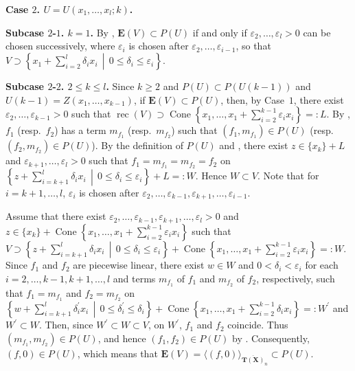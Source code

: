 \documentclass[a4paper,12pt]{amsart}
\theoremstyle{plain}
\theoremstyle{definition}
\begin{document}
\textbf{Case $2$. $U = U(x_1, \ldots, x_l;k)$.}

\textbf{Subcase $2$-$1$. $k = 1$.}
By \cite[the proofs of Propositions~3.18 and 3.19]{Nakajima=Song}, $\boldsymbol{E}(V) \subset P(U)$ if and only if $\varepsilon_2,\ldots,\varepsilon_l>0$ can be chosen successively, where $\varepsilon_i$ is chosen after $\varepsilon_2,\ldots,\varepsilon_{i-1}$, so that $V \supset \left\{ x_1 + \sum_{i = 2}^l \delta_i x_i \,\middle|\, 0 \le \delta_i \le \varepsilon_i \right\}$.

\textbf{Subcase $2$-$2$. $2 \le k \le l$.}
Since $k \ge 2$ and $P(U) \subset P(U(k-1))$ and $U(k-1) = Z(x_1, \ldots, x_{k-1})$, if $\boldsymbol{E}(V) \subset P(U)$, then, by Case~$1$, there exist $\varepsilon_2, \ldots, \varepsilon_{k - 1} > 0$ such that $\operatorname{rec}(V) \supset \operatorname{Cone}\left\{ x_1, \ldots, x_1 + \sum_{i = 2}^{k - 1} \varepsilon_i x_i \right\} =: L$.
By \cite[Proposition~2.10(i)]{Joo=Mincheva}, $f_1$ (resp.~$f_2$) has a term $m_{f_1}$ (resp.~$m_{f_2}$) such that $(f_1, m_{f_1}) \in P(U)$ (resp.~$(f_2, m_{f_2}) \in P(U)$).
By the definition of $P(U)$ and \cite[Remark~2.6]{Nakajima=Song}, there exist $z \in \{ x_k \} + L$ and $\varepsilon_{k + 1}, \ldots, \varepsilon_l > 0$ such that $f_1 = m_{f_1} = m_{f_2} = f_2$ on $\left\{ z + \sum_{i = k + 1}^l \delta_i x_i \,\middle|\, 0 \le \delta_i \le \varepsilon_i \right\} + L =: W$.
Hence $W \subset V$.
Note that for $i = k+1, \ldots, l$, $\varepsilon_i$ is chosen after $\varepsilon_2, \ldots, \varepsilon_{k - 1}, \varepsilon_{k + 1}, \ldots, \varepsilon_{i - 1}$.

Assume that there exist $\varepsilon_2, \ldots, \varepsilon_{k - 1}, \varepsilon_{k + 1}, \ldots, \varepsilon_l > 0$ and $z \in \{ x_k \} + \operatorname{Cone}\left\{ x_1, \ldots, x_1 + \sum_{i = 2}^{k - 1} \varepsilon_i x_i \right\}$ such that $V \supset \left\{ z + \sum_{i = k + 1}^l \delta_i x_i \,\middle|\, 0 \le \delta_i \le \varepsilon_i \right\} + \operatorname{Cone}\left\{ x_1, \ldots, x_1 + \sum_{i = 2}^{k-1} \varepsilon_i x_i \right\} =: W$.
Since $f_1$ and $f_2$ are piecewise linear, there exist $w \in W$ and $0 < \delta_i < \varepsilon_i$ for each $i = 2, \ldots, k - 1, k + 1, \ldots, l$ and terms $m_{f_1}$ of $f_1$ and $m_{f_2}$ of $f_2$, respectively, such that $f_1 = m_{f_1}$ and $f_2 = m_{f_2}$ on $\left\{ w + \sum_{i = k + 1}^l \delta_i^{\prime} x_i \,\middle|\, 0 \le \delta_i^{\prime} \le \delta_i \right\} + \operatorname{Cone}\left\{ x_1, \ldots, x_1 + \sum_{i = 2}^{k-1} \delta_i x_i \right\} =: W^{\prime}$ and $W^{\prime} \subset W$.
Then, since $W^{\prime} \subset W \subset V$, on $W^{\prime}$, $f_1$ and $f_2$ coincide.
Thus $(m_{f_1}, m_{f_2}) \in P(U)$, and hence $(f_1, f_2) \in P(U)$ by \cite[Remark~2.6]{Nakajima=Song}.
Consequently, $(f,0) \in P(U)$, which means that $\boldsymbol{E}(V) = \langle (f,0) \rangle_{\overline{\boldsymbol{T}(\boldsymbol{X})}_n} \subset P(U)$.
\end{document}
